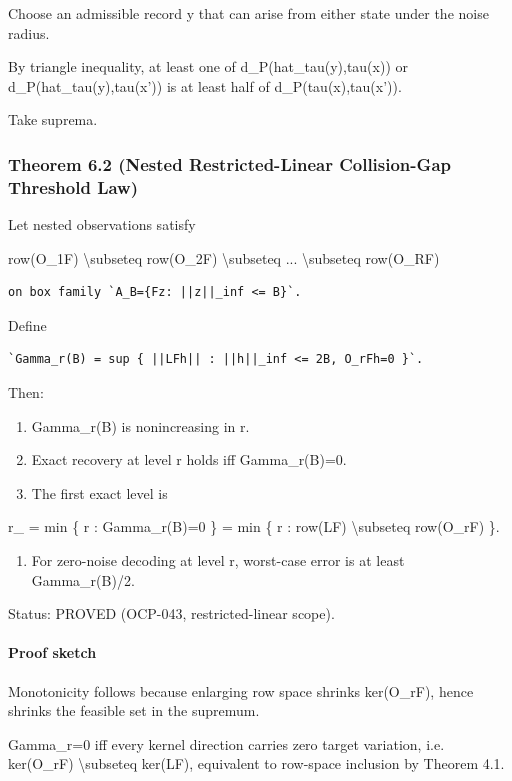 \documentclass[11pt]{article}
\begin{document}
Choose an admissible record y that can arise from either state under the noise radius.

By triangle inequality, at least one of d\_P(hat\_tau(y),tau(x)) or d\_P(hat\_tau(y),tau(x')) is at least half of d\_P(tau(x),tau(x')).

Take suprema.


\subsubsection*{Theorem 6.2 (Nested Restricted-Linear Collision-Gap Threshold Law)}
Let nested observations satisfy


row(O\_1F) \textbackslash{}subseteq row(O\_2F) \textbackslash{}subseteq ... \textbackslash{}subseteq row(O\_RF)


\begin{verbatim}
on box family `A_B={Fz: ||z||_inf <= B}`.
\end{verbatim}
Define


\begin{verbatim}
`Gamma_r(B) = sup { ||LFh|| : ||h||_inf <= 2B, O_rFh=0 }`.
\end{verbatim}

Then:

\begin{enumerate}
\item Gamma\_r(B) is nonincreasing in r.
\item Exact recovery at level r holds iff Gamma\_r(B)=0.
\item The first exact level is
\end{enumerate}

r\_ = min \{ r : Gamma\_r(B)=0 \} = min \{ r : row(LF) \textbackslash{}subseteq row(O\_rF) \}.


\begin{enumerate}
\item For zero-noise decoding at level r, worst-case error is at least Gamma\_r(B)/2.
\end{enumerate}

Status: PROVED (OCP-043, restricted-linear scope).


\paragraph{Proof sketch}
Monotonicity follows because enlarging row space shrinks ker(O\_rF), hence shrinks the feasible set in the supremum.


Gamma\_r=0 iff every kernel direction carries zero target variation, i.e. ker(O\_rF) \textbackslash{}subseteq ker(LF), equivalent to row-space inclusion by Theorem 4.1.
\end{document}
